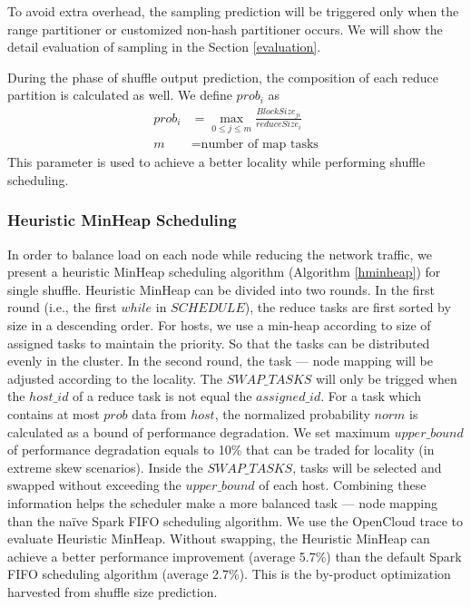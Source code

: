 To avoid extra overhead, the sampling prediction will be triggered only when the range partitioner or customized non-hash partitioner occurs. We will show the detail evaluation of sampling in the Section \ref{evaluation}.

During the phase of shuffle output prediction, the composition of each reduce partition is calculated as well. We define $prob_i$ as
\begin{equation}
\label{equationprob}
\begin{aligned}
	prob_i &= \max_{0 \leq j \leq m} \frac{BlockSize_{ji}}{reduceSize_i} \\
    m &= \text{number of map tasks}
\end{aligned}
\end{equation}
This parameter is used to achieve a better locality while performing shuffle scheduling.

\subsubsection{Heuristic MinHeap Scheduling}\label{h-minheap}
In order to balance load on each node while reducing the network traffic, we present a heuristic MinHeap scheduling algorithm (Algorithm \ref{hminheap}) for single shuffle.  
Heuristic MinHeap can be divided into two rounds. In the first round (i.e., the first $while$ in $SCHEDULE$), the reduce tasks are first sorted by size in a descending order. For hosts, we use a min-heap according to size of assigned tasks to maintain the priority. So that the tasks can be distributed evenly in the cluster.
In the second round, the task --- node mapping will be adjusted according to the locality. 
The $SWAP\_TASKS$ will only be trigged when the $host\_id$ of a reduce task is not equal the $assigned\_id$.
For a task which contains at most $prob$ data from $host$, the normalized probability $norm$ is calculated as a bound of performance degradation. We set maximum $upper\_bound$ of performance degradation equals to 10\% that can be traded for locality (in extreme skew scenarios).
Inside the $SWAP\_TASKS$, tasks will be selected and swapped without exceeding the $upper\_bound$ of each host. 
Combining these information helps the scheduler make a more balanced task --- node mapping than the na\"{i}ve Spark FIFO scheduling algorithm. 
We use the OpenCloud trace to evaluate Heuristic MinHeap. Without swapping, the Heuristic MinHeap can achieve a better performance improvement (average 5.7\%) than the default Spark FIFO scheduling algorithm (average 2.7\%).
This is the by-product optimization harvested from shuffle size prediction.

